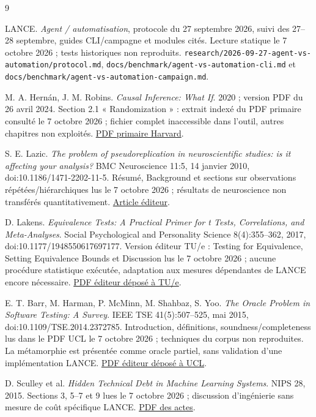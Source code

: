 \documentclass[11pt,a4paper]{article}
\newcommand{\fichier}[1]{\nolinkurl{#1}}
\begin{document}
\begin{thebibliography}{9}
 LANCE. \emph{Agent / automatisation}, protocole du 27 septembre
2026, suivi des 27--28 septembre, guides CLI/campagne et modules cités.
Lecture statique le 7 octobre 2026 ; tests historiques non reproduits.
\fichier{research/2026-09-27-agent-vs-automation/protocol.md},
\fichier{docs/benchmark/agent-vs-automation-cli.md} et
\fichier{docs/benchmark/agent-vs-automation-campaign.md}.

 M. A. Hernán, J. M. Robins. \emph{Causal Inference: What If}.
2020 ; version PDF du 26 avril 2024. Section 2.1 « Randomization » : extrait
indexé du PDF primaire consulté le 7 octobre 2026 ; fichier complet inaccessible
dans l'outil, autres chapitres non exploités.
\href{https://www.hsph.harvard.edu/miguel-hernan/wp-content/uploads/sites/1268/2024/04/hernanrobins_WhatIf_26apr24.pdf}{PDF primaire Harvard}.

 S. E. Lazic. \emph{The problem of pseudoreplication in
neuroscientific studies: is it affecting your analysis?} BMC Neuroscience 11:5,
14 janvier 2010, doi:10.1186/1471-2202-11-5. Résumé, Background et sections
sur observations répétées/hiérarchiques lus le 7 octobre 2026 ; résultats de
neuroscience non transférés quantitativement.
\href{https://link.springer.com/article/10.1186/1471-2202-11-5}{Article éditeur}.

 D. Lakens. \emph{Equivalence Tests: A Practical Primer for
t Tests, Correlations, and Meta-Analyses}. Social Psychological and Personality
Science 8(4):355--362, 2017, doi:10.1177/1948550617697177. Version éditeur
TU/e : Testing for Equivalence, Setting Equivalence Bounds et Discussion lus
le 7 octobre 2026 ; aucune procédure statistique exécutée, adaptation aux
mesures dépendantes de LANCE encore nécessaire.
\href{https://pure.tue.nl/ws/portalfiles/portal/80918653/lakeequi2017.pdf}{PDF éditeur déposé à TU/e}.

 E. T. Barr, M. Harman, P. McMinn, M. Shahbaz, S. Yoo.
\emph{The Oracle Problem in Software Testing: A Survey}. IEEE TSE
41(5):507--525, mai 2015, doi:10.1109/TSE.2014.2372785. Introduction,
définitions, soundness/completeness lus dans le PDF UCL le 7 octobre 2026 ;
techniques du corpus non reproduites. La métamorphie est présentée comme
oracle partiel, sans validation d'une implémentation LANCE.
\href{https://discovery.ucl.ac.uk/1471263/1/06963470.pdf}{PDF éditeur déposé à UCL}.

 D. Sculley et al. \emph{Hidden Technical Debt in Machine
Learning Systems}. NIPS 28, 2015. Sections 3, 5--7 et 9 lues le 7 octobre 2026 ;
discussion d'ingénierie sans mesure de coût spécifique LANCE.
\href{https://proceedings.nips.cc/paper/2015/file/86df7dcfd896fcaf2674f757a2463eba-Paper.pdf}{PDF des actes}.
\end{thebibliography}
\end{document}
